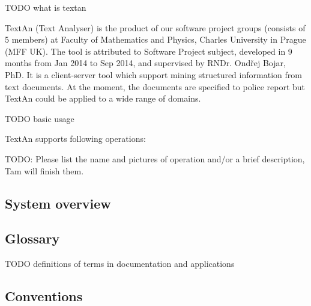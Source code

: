 \documentclass[12pt,a4paper]{report}
\begin{document}


TODO what is textan

TextAn (Text Analyser) is the product of our software project groups (consists of 5 members) at Faculty of Mathematics and Physics, Charles University in Prague (MFF UK). The tool is attributed to Software Project subject, developed in 9 months from Jan 2014 to Sep 2014, and supervised by RNDr. Ondřej Bojar, PhD. It is a client-server tool which support mining structured information from text documents. At the moment, the documents are specified to police report but TextAn could be applied to a wide range of domains. 

% 

TODO basic usage

TextAn supports following operations:

TODO: Please list the name and pictures of operation and/or a brief description, Tam will finish them.

\subsection{System overview}



\subsection{Glossary}

TODO definitions of terms in documentation and applications

\subsection{Conventions} %
\end{document}
